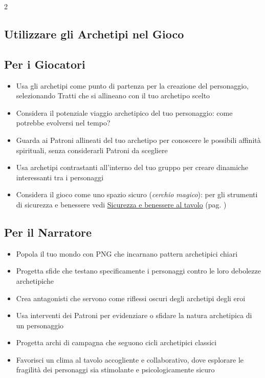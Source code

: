 \begin{multicols}{2}
\subsection*{Utilizzare gli Archetipi nel Gioco}

\subsection*{Per i Giocatori}
\noindent\begin{itemize}[leftmargin=*] \setlength{\itemsep}{0pt}
\item Usa gli archetipi come punto di partenza per la creazione del personaggio, selezionando Tratti che si allineano con il tuo archetipo scelto
        \item Considera il potenziale viaggio archetipico del tuo personaggio: come potrebbe evolversi nel tempo?
\item Guarda ai Patroni allineati del tuo archetipo per conoscere le possibili affinità spirituali, senza considerarli Patroni da scegliere
        \item Usa archetipi contrastanti all'interno del tuo gruppo per creare dinamiche interessanti tra i personaggi
\item Considera il gioco come uno spazio sicuro (\emph{cerchio magico}): per gli strumenti di sicurezza e benessere vedi \hyperlink{sicurezzatavolo}{Sicurezza e benessere al tavolo} (pag. \pageref{sicurezzatavolo})
\end{itemize}

\subsection*{Per il Narratore}
\noindent\begin{itemize}[leftmargin=*] \setlength{\itemsep}{0pt}
\item Popola il tuo mondo con PNG che incarnano pattern archetipici chiari
\item Progetta sfide che testano specificamente i personaggi contro le loro debolezze archetipiche
\item Crea antagonisti che servono come riflessi oscuri degli archetipi degli eroi
\item Usa interventi dei Patroni per evidenziare o sfidare la natura archetipica di un personaggio
\item Progetta archi di campagna che seguono cicli archetipici classici
\item Favorisci un clima al tavolo accogliente e collaborativo, dove esplorare le fragilità dei personaggi sia stimolante e psicologicamente sicuro
\end{itemize}


\end{multicols}
